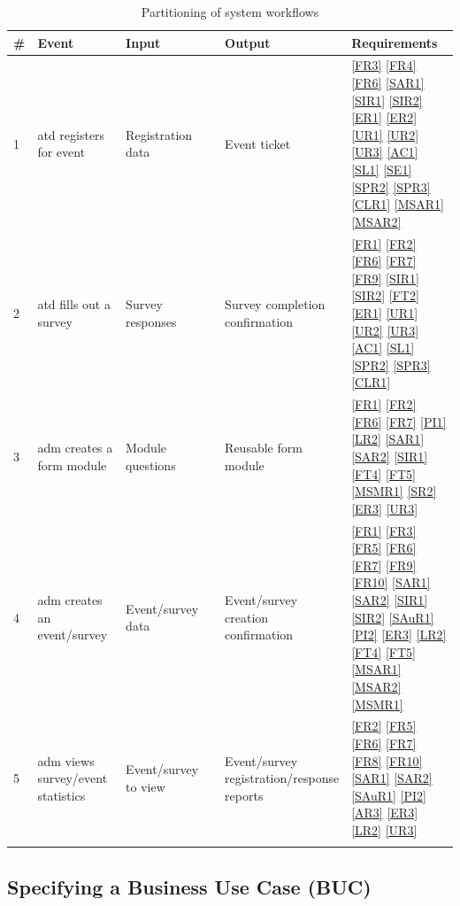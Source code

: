 \documentclass[12pt]{article}
\begin{document}
{
  \setlength{\tabcolsep}{0.2em}
  \renewcommand{\arraystretch}{1.2}
\begin{longtable}[H]{p{0.03\linewidth}p{0.21\linewidth}p{0.25\linewidth}p{0.25\linewidth}p{0.28\linewidth}}
      \textbf{\#} & \textbf{Event} & \textbf{Input} & \textbf{Output} & \textbf{Requirements} \\ \hline
      1 & \Gls{atd} registers for event & Registration data & Event ticket & \ref{FR3} \ref{FR4} \ref{FR6} \ref{SAR1} \ref{SIR1} \ref{SIR2} \ref{ER1} \ref{ER2} \ref{UR1} \ref{UR2} \ref{UR3} \ref{AC1} \ref{SL1} \ref{SE1} \ref{SPR2} \ref{SPR3} \ref{CLR1} \ref{MSAR1} \ref{MSAR2} \\ \hline
      2 & \Gls{atd} fills out a survey & Survey responses & Survey completion confirmation & \ref{FR1} \ref{FR2} \ref{FR6} \ref{FR7} \ref{FR9} \ref{SIR1} \ref{SIR2} \ref{FT2} \ref{ER1} \ref{UR1} \ref{UR2} \ref{UR3} \ref{AC1} \ref{SL1} \ref{SPR2} \ref{SPR3} \ref{CLR1} \\ \hline
      3 & \Gls{adm} creates a form module & Module questions & Reusable form module & \ref{FR1} \ref{FR2} \ref{FR6} \ref{FR7} \ref{PI1} \ref{LR2} \ref{SAR1} \ref{SAR2} \ref{SIR1} \ref{FT4} \ref{FT5} \ref{MSMR1} \ref{SR2} \ref{ER3} \ref{UR3}\\ \hline
      4 & \Gls{adm} creates an event/survey & Event/survey data & Event/survey creation confirmation & \ref{FR1} \ref{FR3} \ref{FR5} \ref{FR6} \ref{FR7} \ref{FR9} \ref{FR10} \ref{SAR1} \ref{SAR2} \ref{SIR1} \ref{SIR2} \ref{SAuR1} \ref{PI2} \ref{ER3} \ref{LR2} \ref{FT4} \ref{FT5} \ref{MSAR1} \ref{MSAR2} \ref{MSMR1}\\ \hline
      5 & \Gls{adm} views survey/event statistics & Event/survey to view & Event/survey registration/response reports & \ref{FR2} \ref{FR5} \ref{FR6} \ref{FR7} \ref{FR8} \ref{FR10} \ref{SAR1} \ref{SAR2} \ref{SAuR1} \ref{PI2} \ref{AR3} \ref{ER3} \ref{LR2} \ref{UR3}
      \\ \hline
    \caption{Partitioning of system workflows}\label{wfpart}
  \end{longtable}
}

\subsection{Specifying a Business Use Case (BUC)}
\end{document}
